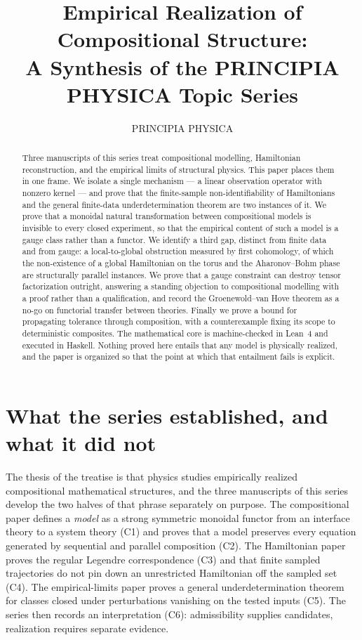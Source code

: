 \documentclass[11pt]{article}
\title{Empirical Realization of Compositional Structure:\\
A Synthesis of the PRINCIPIA PHYSICA Topic Series}
\author{PRINCIPIA PHYSICA}
\date{}
\theoremstyle{definition}
\begin{document}
\maketitle

\begin{abstract}
Three manuscripts of this series treat compositional modelling, Hamiltonian
reconstruction, and the empirical limits of structural physics. This paper
places them in one frame. We isolate a single mechanism --- a linear observation
operator with nonzero kernel --- and prove that the finite-sample
non-identifiability of Hamiltonians and the general finite-data
underdetermination theorem are two instances of it. We prove that a monoidal
natural transformation between compositional models is invisible to every closed
experiment, so that the empirical content of such a model is a gauge class
rather than a functor. We identify a third gap, distinct from finite data and
from gauge: a local-to-global obstruction measured by first cohomology, of which
the non-existence of a global Hamiltonian on the torus and the Aharonov--Bohm
phase are structurally parallel instances. We prove that a gauge constraint can
destroy tensor factorization outright, answering a standing objection to
compositional modelling with a proof rather than a qualification, and record the
Groenewold--van Hove theorem as a no-go on functorial transfer between theories.
Finally we prove a bound for propagating tolerance through composition, with a
counterexample fixing its scope to deterministic composites. The mathematical
core is machine-checked in Lean~4 and executed in Haskell. Nothing proved here
entails that any model is physically realized, and the paper is organized so
that the point at which that entailment fails is explicit.
\end{abstract}

\section{What the series established, and what it did not}
\label{sec:intro}

The thesis of the treatise is that physics studies empirically realized
compositional mathematical structures, and the three manuscripts of this series
develop the two halves of that phrase separately on purpose. The compositional
paper defines a \emph{model} as a strong symmetric monoidal functor from an
interface theory to a system theory (C1) and proves that a model preserves every
equation generated by sequential and parallel composition (C2). The Hamiltonian
paper proves the regular Legendre correspondence (C3) and that finite sampled
trajectories do not pin down an unrestricted Hamiltonian off the sampled set
(C4). The empirical-limits paper proves a general underdetermination theorem for
classes closed under perturbations vanishing on the tested inputs (C5). The
series then records an interpretation (C6): admissibility supplies candidates,
realization requires separate evidence.
\end{document}

